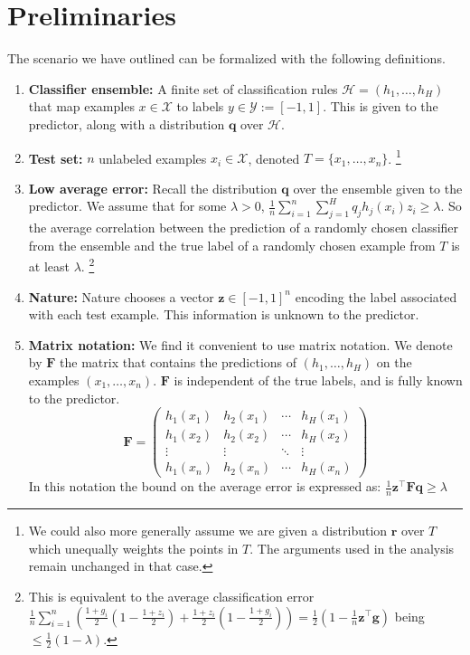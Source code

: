 \documentclass{article}[12pt]
\theoremstyle{named}
\newcommand{\vF}{\mathbf{F}}    %
\newcommand{\vg}{\mathbf{g}}    %
\newcommand{\vq}{\mathbf{q}}
\newcommand{\vr}{\mathbf{r}}
\newcommand{\vz}{\mathbf{z}}
\newcommand{\cH}{\mathcal{H}}
\newcommand{\cX}{\mathcal{X}}
\newcommand{\cY}{\mathcal{Y}}
\newcommand{\lrp}[1]{\left(#1\right)}
\begin{document}
\section{Preliminaries}
\label{sec:setup}
The scenario we have outlined can be formalized with the following definitions.
\begin{enumerate}
\item {\bf Classifier ensemble:} 
A finite set of classification rules $\cH=(h_1,\ldots,h_H)$ 
that map examples $x \in \cX$ to labels $y \in \cY := [-1,1]$. 
This is given to the predictor, along with a distribution $\vq$ over $\cH$.

\item {\bf Test set:} $n$ unlabeled examples $x_i \in \cX$, 
denoted $T = \{x_1,\ldots,x_n\}$. 
\footnote{We could also more generally assume we are given a distribution $\vr$ over $T$ 
which unequally weights the points in $T$. 
The arguments used in the analysis remain unchanged in that case. }

\item {\bf Low average error:} 
Recall the distribution $\vq$ over the ensemble given to the predictor. 
We assume that for some $\lambda > 0$,
$\displaystyle \frac{1}{n} \sum_{i=1}^n \sum_{j=1}^H q_j h_j(x_i) z_i \geq \lambda$.
So the average correlation between the prediction of a randomly chosen classifier from the ensemble
and the true label of a randomly chosen example from $T$ is at least $\lambda$. 
\footnote{This is equivalent to the average classification error 
$\frac{1}{n} \sum_{i=1}^n \lrp{\frac{1+g_i}{2} \lrp{1 - \frac{1+z_i}{2}} + \frac{1+z_i}{2} \lrp{1 - \frac{1+g_i}{2}}} = \frac{1}{2} \lrp{1 - \frac{1}{n} \vz^\top \vg}$ 
being $\leq \frac{1}{2} (1 - \lambda)$.}

\item {\bf Nature:} 
Nature chooses a vector $\vz \in [-1,1]^n$ encoding the label associated with each test example.
This information is unknown to the predictor. 

\item{\bf Matrix notation:} We find it convenient to use matrix
  notation. We denote by $\vF$ the matrix that contains the predictions of
$(h_1,\ldots,h_H)$ on the examples $(x_1,\ldots,x_n)$. 
$\vF$ is independent of the true labels, and is fully known to the predictor.
\begin{equation}
\vF = 
 \begin{pmatrix}
   h_1(x_1) & h_2(x_1) & \cdots & h_H (x_1) \\
   h_1(x_2) &  h_2(x_2) & \cdots & h_H (x_2) \\
   \vdots   & \vdots    & \ddots &  \vdots  \\
   h_1(x_n)  &  h_2(x_n)  & \cdots &  h_H (x_n)
 \end{pmatrix}
\end{equation}
In this notation the bound on the average error is expressed as:
$\frac{1}{n} \vz^\top \vF \vq \geq \lambda$
\end{enumerate}
\end{document}
